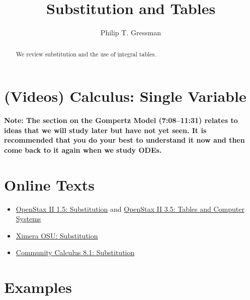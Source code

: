 \documentclass{ximera}
\title{Substitution and Tables}
\author{Philip T. Gressman}
\begin{document}
\begin{abstract}
We review substitution and the use of integral tables.
\end{abstract}
\maketitle


\section*{(Videos) Calculus: Single Variable}
\textbf{Note: The section on the Gompertz Model (7:08--11:31) relates to ideas that we will study later but have not yet seen. It is recommended that you do your best to understand it now and then come back to it again when we study ODEs.}

\section*{Online Texts}
\begin{itemize}
\item \href{https://openstax.org/books/calculus-volume-2/pages/1-5-substitution}{OpenStax II 1.5: Substitution} and  \href{https://openstax.org/books/calculus-volume-2/pages/3-5-other-strategies-for-integration}{OpenStax II 3.5: Tables and Computer Systems}
\item \href{https://ximera.osu.edu/mooculus/calculus1/substitution/titlePage}{Ximera OSU: Substitution}
\item \href{https://www.whitman.edu/mathematics/calculus_online/section08.01.html}{Community Calculus 8.1: Substitution}
\end{itemize}

\section*{Examples}
\end{document}
